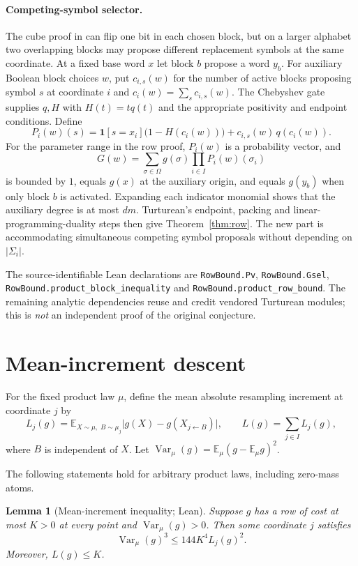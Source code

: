 \documentclass[11pt]{article}
\newtheorem{lemma}[theorem]{Lemma}
\newcommand{\Var}{\operatorname{Var}}
\newcommand{\E}{\mathbb E}
\newcommand{\one}{\mathbf 1}
\begin{document}
\paragraph{Competing-symbol selector.}
The cube proof in \cite{Tur26} can flip one bit in each chosen block, but on a larger alphabet two overlapping blocks may propose different replacement symbols at the same coordinate. At a fixed base word $x$ let block $b$ propose a word $y_b$. For auxiliary Boolean block choices $w$, put $c_{i,s}(w)$ for the number of active blocks proposing symbol $s$ at coordinate $i$ and $c_i(w)=\sum_s c_{i,s}(w)$. The Chebyshev gate supplies $q,H$ with $H(t)=tq(t)$ and the appropriate positivity and endpoint conditions. Define
\[
P_i(w)(s)=\one[s=x_i]\bigl(1-H(c_i(w))\bigr)
+c_{i,s}(w)\,q(c_i(w)).
\]
For the parameter range in the row proof, $P_i(w)$ is a probability vector, and
\[
G(w)=\sum_{\sigma\in\Omega}g(\sigma)\prod_{i\in I}P_i(w)(\sigma_i)
\]
is bounded by $1$, equals $g(x)$ at the auxiliary origin, and equals $g(y_b)$ when only block $b$ is activated. Expanding each indicator monomial shows that the auxiliary degree is at most $dm$. Turturean's endpoint, packing and linear-programming-duality steps then give Theorem~\ref{thm:row}. The new part is accommodating simultaneous competing symbol proposals without depending on $|\Sigma_i|$.

The source-identifiable Lean declarations are \texttt{RowBound.Pv},
\texttt{RowBound.Gsel}, \texttt{RowBound.product\_block\_inequality}
and \texttt{RowBound.product\_row\_bound}. The remaining analytic dependencies reuse and credit vendored Turturean modules; this is \emph{not} an independent proof of the original conjecture.

\section{Mean-increment descent}
For the fixed product law $\mu$, define the mean absolute resampling increment at coordinate $j$ by
\[
L_j(g)=\E_{X\sim\mu,\;B\sim\mu_j}
\bigl|g(X)-g(X_{j\leftarrow B})\bigr|,
\qquad
L(g)=\sum_{j\in I}L_j(g),
\]
where $B$ is independent of $X$. Let $\Var_\mu(g)=\E_\mu(g-\E_\mu g)^2$.

The following statements hold for arbitrary product laws, including zero-mass atoms.

\begin{lemma}[Mean-increment inequality; Lean]\label{lem:increment}
Suppose $g$ has a row of cost at most $K>0$ at every point and $\Var_\mu(g)>0$. Then some coordinate $j$ satisfies
\[
\Var_\mu(g)^3\le144K^4 L_j(g)^2.
\]
Moreover, $L(g)\le K$.
\end{lemma}
\end{document}
